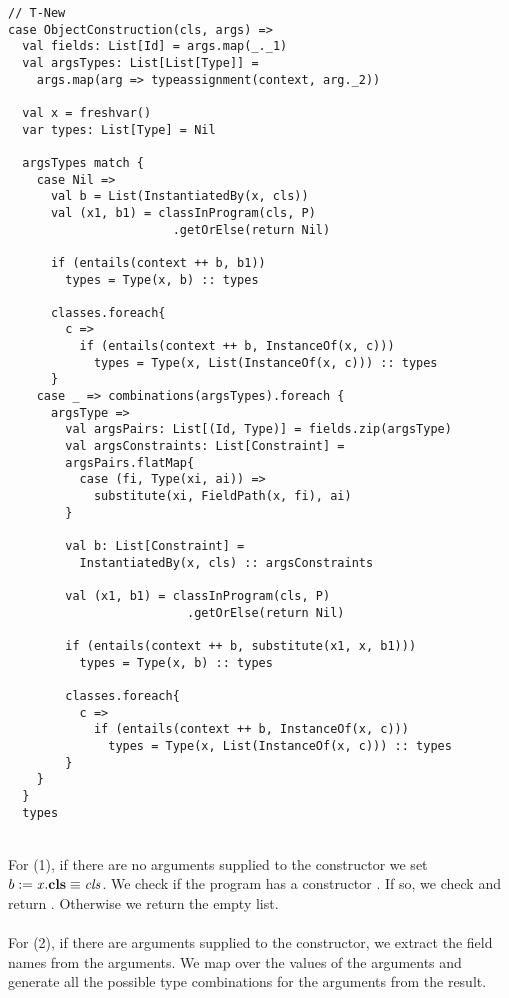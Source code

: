 \newpage
%
\begin{lstlisting}[caption={Case T-New},label=lst:scala-typeass-new,captionpos=b,frame={lines}]
// T-New
case ObjectConstruction(cls, args) =>
  val fields: List[Id] = args.map(_._1)
  val argsTypes: List[List[Type]] =
    args.map(arg => typeassignment(context, arg._2))

  val x = freshvar()
  var types: List[Type] = Nil

  argsTypes match {
    case Nil =>
      val b = List(InstantiatedBy(x, cls))
      val (x1, b1) = classInProgram(cls, P)
                       .getOrElse(return Nil)

      if (entails(context ++ b, b1))
        types = Type(x, b) :: types

      classes.foreach{
        c =>
          if (entails(context ++ b, InstanceOf(x, c)))
            types = Type(x, List(InstanceOf(x, c))) :: types
      }
    case _ => combinations(argsTypes).foreach {
      argsType =>
        val argsPairs: List[(Id, Type)] = fields.zip(argsType)
        val argsConstraints: List[Constraint] =
        argsPairs.flatMap{
          case (fi, Type(xi, ai)) =>
            substitute(xi, FieldPath(x, fi), ai)
        }

        val b: List[Constraint] =
          InstantiatedBy(x, cls) :: argsConstraints

        val (x1, b1) = classInProgram(cls, P)
                         .getOrElse(return Nil)

        if (entails(context ++ b, substitute(x1, x, b1)))
          types = Type(x, b) :: types

        classes.foreach{
          c =>
            if (entails(context ++ b, InstanceOf(x, c)))
              types = Type(x, List(InstanceOf(x, c))) :: types
        }
    }
  }
  types
\end{lstlisting}
\newpage
%
\quad\\
For (1), if there are no arguments supplied to the constructor
we set $b := \mathit{x}.\textbf{cls} \equiv \mathit{cls}$.
We check if the program has a constructor .
If so, we check 
and return .
Otherwise we return the empty list.\\
\\
For (2), if there are arguments supplied to the constructor,
we extract the field names from the arguments.
We map 
over the values of the arguments
and generate all the possible type combinations
for the arguments from the result.
